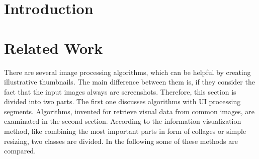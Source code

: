 \documentclass[draft,final]{vutinfth} %
\begin{document}
\chapter{Introduction}

\chapter{Related Work}
There are several image processing algorithms, which can be helpful by creating illustrative thumbnails.
The main difference between them is, if they consider the fact that the input images always are screenshots.
Therefore, this section is divided into two parts.
The first one discusses algorithms with UI processing segments.
Algorithms, invented for retrieve visual data from common images, are examinated in the second section. 
According to the information visualization method, like combining the most important parts in form of collages or simple resizing, two classes are divided.
In the following some of these methods are compared.
\end{document}

